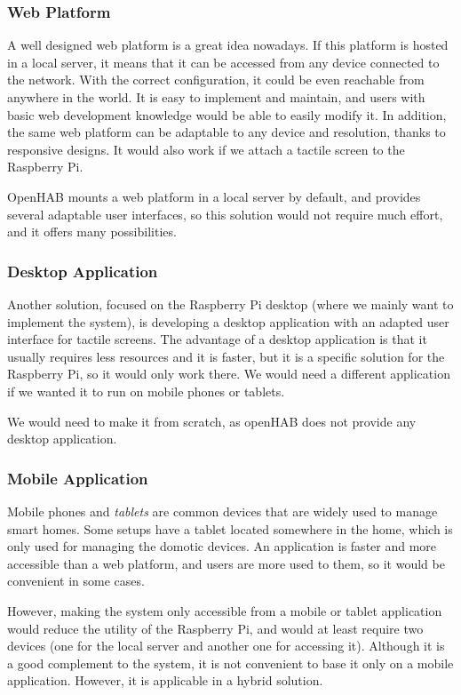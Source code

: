 \subsubsection{Web Platform}
A well designed web platform is a great idea nowadays. If this platform is hosted in a local server, it means that it can be accessed
from any device connected to the network. With the correct configuration, it could be even reachable from anywhere in the world.
It is easy to implement and maintain, and users with basic web development knowledge would be able to easily modify it. In addition,
the same web platform can be adaptable to any device and resolution, thanks to responsive designs. It would also work if we attach
a tactile screen to the Raspberry Pi.

OpenHAB mounts a web platform in a local server by default, and provides several adaptable user interfaces, so this solution would
not require much effort, and it offers many possibilities.

\subsubsection{Desktop Application}
Another solution, focused on the Raspberry Pi desktop (where we mainly want to implement the system), is developing a desktop
application with an adapted user interface for tactile screens. The advantage of a desktop application is that it usually requires
less resources and it is faster, but it is a specific solution for the Raspberry Pi, so it would only work there. We would need a
different application if we wanted it to run on mobile phones or tablets.

We would need to make it from scratch, as openHAB does not provide any desktop application.

\subsubsection{Mobile Application}
Mobile phones and \textit{tablets} are common devices that are widely used to manage smart homes. Some setups have a tablet located
somewhere in the home, which is only used for managing the domotic devices. An application is faster and more accessible than a web
platform, and users are more used to them, so it would be convenient in some cases.

However, making the system only accessible from a mobile or tablet application would reduce the utility of the Raspberry Pi, and
would at least require two devices (one for the local server and another one for accessing it). Although it is a good complement to the
system, it is not convenient to base it only on a mobile application. However, it is applicable in a hybrid solution.


